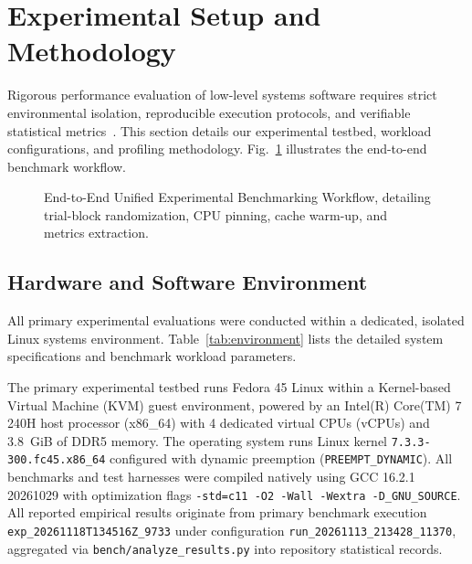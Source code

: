 \section{Experimental Setup and Methodology}
\label{sec:methodology}



Rigorous performance evaluation of low-level systems software requires strict environmental isolation, reproducible execution protocols, and verifiable statistical metrics~\cite{gregg2020systems}. This section details our experimental testbed, workload configurations, and profiling methodology. Fig.~\ref{fig:benchmark_workflow} illustrates the end-to-end benchmark workflow.

\begin{figure}[!t]
\centering

\caption{End-to-End Unified Experimental Benchmarking Workflow, detailing trial-block randomization, CPU pinning, cache warm-up, and metrics extraction.}
\label{fig:benchmark_workflow}
\end{figure}

\subsection{Hardware and Software Environment}
All primary experimental evaluations were conducted within a dedicated, isolated Linux systems environment. Table~\ref{tab:environment} lists the detailed system specifications and benchmark workload parameters.

The primary experimental testbed runs Fedora 45 Linux within a Kernel-based Virtual Machine (KVM) guest environment, powered by an Intel(R) Core(TM) 7 240H host processor (x86\_64) with 4 dedicated virtual CPUs (vCPUs) and 3.8~GiB of DDR5 memory. The operating system runs Linux kernel \texttt{7.3.3-300.fc45.x86\_64} configured with dynamic preemption (\texttt{PREEMPT\_DYNAMIC}). All benchmarks and test harnesses were compiled natively using GCC 16.2.1 20261029 with optimization flags \texttt{-std=c11 -O2 -Wall -Wextra -D\_GNU\_SOURCE}. All reported empirical results originate from primary benchmark execution \texttt{exp\_20261118T134516Z\_9733} under configuration \texttt{run\_20261113\_213428\_11370}, aggregated via \texttt{bench/analyze\_results.py} into repository statistical records.

